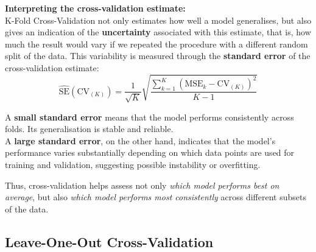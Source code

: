 \documentclass[
  letterpaper,
  DIV=11,
  numbers=noendperiod]{scrartcl}
\begin{document}
\textbf{Interpreting the cross-validation estimate:}\\
K-Fold Cross-Validation not only estimates how well a model generalises,
but also gives an indication of the \textbf{uncertainty} associated with
this estimate, that is, how much the result would vary if we repeated
the procedure with a different random split of the data. This
variability is measured through the \textbf{standard error} of the
cross-validation estimate:
\[ \widehat{\text{SE}}(\text{CV}_{(K)}) = \frac{1}{\sqrt{K}} \sqrt{\frac{\sum_{k=1}^{K}(\text{MSE}_k - \text{CV}_{(K)})^2}{K - 1}}\]

A \textbf{small standard error} means that the model performs
consistently across folds. Its generalisation is stable and reliable.\\
A \textbf{large standard error}, on the other hand, indicates that the
model's performance varies substantially depending on which data points
are used for training and validation, suggesting possible instability or
overfitting.

Thus, cross-validation helps assess not only \emph{which model performs
best on average}, but also \emph{which model performs most consistently}
across different subsets of the data.

\subsection{Leave-One-Out
Cross-Validation}\label{leave-one-out-cross-validation}
\end{document}
